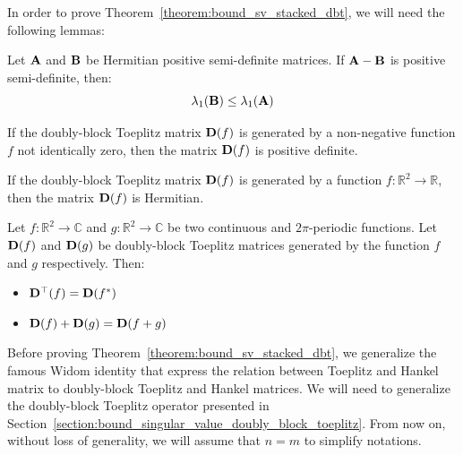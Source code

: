 In order to prove Theorem~\ref{theorem:bound_sv_stacked_dbt}, we will need the following lemmas:

\begin{lemma} \label{theorem:diff_positive_semidefinite_matrices}
Let $\mathbf{A}$ and $\mathbf{B}$ be Hermitian positive semi-definite matrices. If $\mathbf{A} - \mathbf{B}$ is positive semi-definite, then:
\begin{equation*}
    \lambda_1 \left( \Bmat \right) \leq \lambda_1 \left( \Amat \right)
\end{equation*}
\end{lemma}

\begin{lemma} \label{theorem:block_toeplitz_positive_definite}
If the doubly-block Toeplitz matrix $\mathbf{D}(f)$ is generated by a non-negative function $f$ not identically zero, then the matrix $\mathbf{D}(f)$ is positive definite. 
\end{lemma}

\begin{lemma} \label{theorem:block_toeplitz_hermitian}
If the doubly-block Toeplitz matrix $\mathbf{D}(f)$ is generated by a function $f: \mathbb{R}^2 \rightarrow \mathbb{R}$, then the matrix $\mathbf{D}(f)$ is Hermitian. 
\end{lemma}

\begin{lemma} \label{theorem:properties_block_toeplitz}
Let $f:\mathbb{R}^2 \rightarrow \mathbb{C}$ and $g:\mathbb{R}^2 \rightarrow \mathbb{C}$ be two continuous and $2\pi$-periodic functions. Let $\mathbf{D}(f)$ and $\mathbf{D}(g)$ be doubly-block Toeplitz matrices generated by the function $f$ and $g$ respectively. Then:
\begin{itemize}
    \item $\mathbf{D}^\top(f) = \mathbf{D}(f^*)$
    \item $\mathbf{D}(f) + \mathbf{D}(g) = \mathbf{D}(f + g)$
\end{itemize}
\end{lemma}

Before proving Theorem~\ref{theorem:bound_sv_stacked_dbt}, we generalize the famous Widom identity \cite{widom1976asymptotic} that express the relation between Toeplitz and Hankel matrix to doubly-block Toeplitz and Hankel matrices.
We will need to generalize the doubly-block Toeplitz operator presented in Section~\ref{section:bound_singular_value_doubly_block_toeplitz}.
From now on, without loss of generality, we will assume that $n=m$ to simplify notations. 

